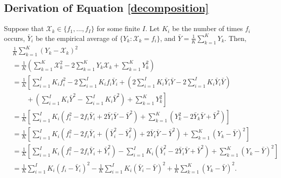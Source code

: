 \documentclass[11pt]{article}
\theoremstyle{definition}
\theoremstyle{definition}
\begin{document}
\subsection{Derivation of Equation \ref{decomposition}}
Suppose that $\mathcal{X}_k \in \{f_1, \dots, f_I\}$ for some finite $I$. Let $K_i$ be the number of times $f_i$ occurs, $\bar{Y}_i$ be the empirical average of $\{Y_k : \mathcal{X}_k = f_i\}$, and $\bar{Y} = \frac{1}{K} \sum_{k=1}^K Y_k$. Then,
\begin{align*}
& \frac{1}{K} \sum_{k=1}^K (Y_k - \mathcal{X}_k)^2\\
 &= \frac{1}{K} \left( \sum_{k=1}^K \mathcal{X}_k^2 - 2\sum_{k=1}^KY_k\mathcal{X}_k + \sum_{k=1}^KY_k^2 \right)\\
 &= \frac{1}{K} \left[ \sum_{i=1}^I K_i f_i^2 - 2\sum_{i=1}^I K_i f_i \bar{Y}_i + \left( 2 \sum_{i=1}^IK_i\bar{Y}_i\bar{Y}- 2 \sum_{i=1}^IK_i\bar{Y}_i\bar{Y} \right) \right. \\
 &\qquad \left. {} +  \left( \sum_{i=1}^IK_i\bar{Y}^2- \sum_{i=1}^IK_i\bar{Y}^2 \right) + \sum_{k=1}^KY_k^2 \right]\\
 &= \frac{1}{K} \left[ \sum_{i=1}^I K_i \left( f_i^2 - 2 f_i \bar{Y}_i + 2 \bar{Y}_i\bar{Y}-  \bar{Y}^2 \right) + \sum_{k=1}^K(Y_k^2 -2\bar{Y}_k\bar{Y}+ \bar{Y}^2) \right]\\
 &= \frac{1}{K} \left[ \sum_{i=1}^I K_i \left( f_i^2 - 2 f_i \bar{Y}_i + (\bar{Y}_i^2 - \bar{Y}_i^2) + 2 \bar{Y}_i\bar{Y}-  \bar{Y}^2 \right) + \sum_{k=1}^K(Y_k -\bar{Y})^2 \right]\\
 &= \frac{1}{K} \left[ \sum_{i=1}^I K_i \left( f_i^2 - 2 f_i \bar{Y}_i + \bar{Y}_i^2 \right)  - \sum_{i=1}^I K_i  \left(\bar{Y}_i^2 - 2 \bar{Y}_i\bar{Y} + \bar{Y}^2 \right) + \sum_{k=1}^K(Y_k -\bar{Y})^2 \right]\\
 &=  \frac{1}{K} \sum_{i=1}^I K_i \left( f_i - \bar{Y}_i \right)^2  - \frac{1}{K} \sum_{i=1}^I K_i  \left(\bar{Y}_i - \bar{Y} \right)^2 + \frac{1}{K} \sum_{k=1}^K(Y_k -\bar{Y})^2.
\end{align*}





%

\end{document}
